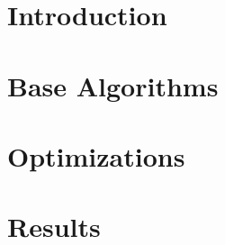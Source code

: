 \chapter{Introduction}




\chapter{Base Algorithms}





\chapter{Optimizations}



\chapter{Results}


